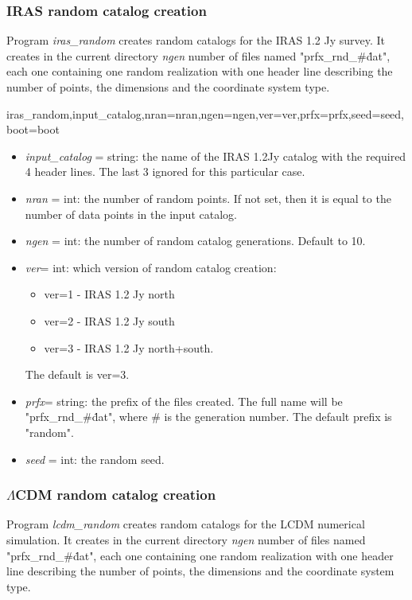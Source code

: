 \subsubsection{IRAS random catalog creation}
Program {\em iras\_random} creates random 
catalogs for the IRAS 1.2 Jy survey. It creates in the current directory 
{\em ngen} number of files named "prfx\_rnd\_\#\.dat", each one containing 
one random realization with one header line describing the number of points,
the dimensions and the coordinate system type.
\begin{center}
    iras\_random,input\_catalog,nran=nran,ngen=ngen,ver=ver,prfx=prfx,seed=seed,boot=boot
\end{center}
\begin{itemize}
\item {\em  input\_catalog }= string: the name of the IRAS 1.2Jy catalog with the
                       required 4 header lines. The last 3 ignored for 
                       this particular case. 
\item {\em  nran }= int: the number of random points. If not set, then it is
              equal to the number of data points in the input catalog.
\item {\em  ngen }= int: the number of random catalog generations. Default to
              10.
\item {\em  ver}= int: which version of random catalog creation: 
\begin{itemize}
\item {ver=1} - IRAS 1.2 Jy north
\item {ver=2} - IRAS 1.2 Jy south
\item {ver=3} - IRAS 1.2 Jy north+south.
\end{itemize}
The default is ver=3.
\item {\em  prfx}= string: the prefix of the files created. The full name 
will be "prfx\_rnd\_\#\.dat", where \# is the generation number. The
default prefix is "random".
\item {\em  seed }= int:  the random seed.
\end{itemize}

\subsubsection{$\Lambda$CDM random catalog creation}
Program {\em lcdm\_random} creates random catalogs 
for the LCDM numerical simulation.
It creates in the current directory 
{\em ngen} number of files named "prfx\_rnd\_\#\.dat", each one containing 
one random realization with one header line describing the number of points,
the dimensions and the coordinate system type.
  
